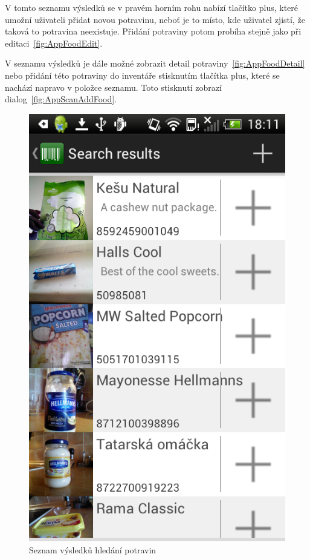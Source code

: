 \documentclass[thesis=B,czech]{FITthesis}[2013/10/20]
\begin{document}
V tomto seznamu výsledků se v pravém horním rohu nabízí tlačítko plus, které umožní uživateli přidat novou potravinu, neboť je to místo, kde uživatel zjistí, že taková to potravina neexistuje. Přidání potraviny potom probíha stejně jako při editaci~\ref{fig:AppFoodEdit}.

V seznamu výsledků je dále možné zobrazit detail potraviny~\ref{fig:AppFoodDetail} nebo přidání této potraviny do inventáře stisknutím tlačítka plus, které se nachází napravo v položce seznamu. Toto stisknutí zobrazí dialog~\ref{fig:AppScanAddFood}.

\begin{figure}[H]
  \centering
  \includegraphics[scale=0.4]{screenshots/app_search_results.png}
  \caption{Seznam výsledků hledání potravin}
  \label{fig:AppSearchResults}
\end{figure}
\end{document}

